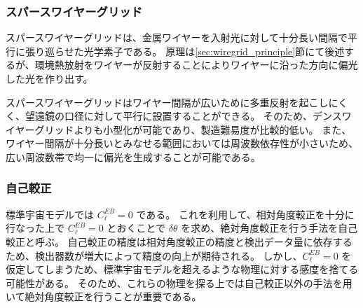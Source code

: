 \documentclass[../../main.tex]{subfiles}
\begin{document}
\subsubsection{スパースワイヤーグリッド}
スパースワイヤーグリッドは、金属ワイヤーを入射光に対して十分長い間隔で平行に張り巡らせた光学素子である。
原理は\ref{sec:wiregrid_principle}節にて後述するが、環境熱放射をワイヤーが反射することによりワイヤーに沿った方向に偏光した光を作り出す。

スパースワイヤーグリッドはワイヤー間隔が広いために多重反射を起こしにくく、望遠鏡の口径に対して平行に設置することができる。
そのため、デンスワイヤーグリッドよりも小型化が可能であり、製造難易度が比較的低い。
また、ワイヤー間隔が十分長いとみなせる範囲においては周波数依存性が小さいため、
広い周波数帯で均一に偏光を生成することが可能である。

\subsubsection{自己較正}
標準宇宙モデルでは $C_{\ell}^{EB}=0$ である。
これを利用して、相対角度較正を十分に行なった上で $C_{\ell}^{EB} = 0$ とおくことで
$\delta\theta$ を求め、絶対角度較正を行う手法を自己較正と呼ぶ。
自己較正の精度は相対角度較正の精度と検出データ量に依存するため、検出器数が増大によって精度の向上が期待される。
しかし、$C_{\ell}^{EB}=0$ を仮定してしまうため、標準宇宙モデルを超えるような物理に対する感度を捨てる可能性がある。
そのため、これらの物理を探る上では自己較正以外の手法を用いて絶対角度較正を行うことが重要である。
\end{document}
